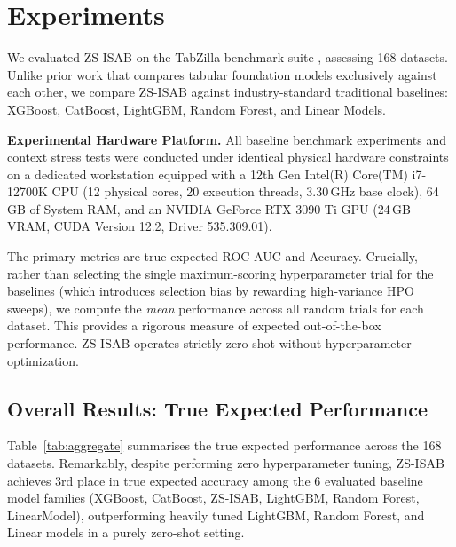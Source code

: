 \documentclass[10pt]{article}
\begin{document}
\section{Experiments}

We evaluated ZS-ISAB on the TabZilla benchmark suite \citep{mcelfresh2023when}, assessing 168 datasets. Unlike prior work that compares tabular foundation models exclusively against each other, we compare ZS-ISAB against industry-standard traditional baselines: XGBoost, CatBoost, LightGBM, Random Forest, and Linear Models.

\textbf{Experimental Hardware Platform.} All baseline benchmark experiments and context stress tests were conducted under identical physical hardware constraints on a dedicated workstation equipped with a 12th Gen Intel(R) Core(TM) i7-12700K CPU (12 physical cores, 20 execution threads, 3.30\,GHz base clock), 64\,GB of System RAM, and an NVIDIA GeForce RTX 3090 Ti GPU (24\,GB VRAM, CUDA Version 12.2, Driver 535.309.01).

The primary metrics are true expected ROC AUC and Accuracy. Crucially, rather than selecting the single maximum-scoring hyperparameter trial for the baselines (which introduces selection bias by rewarding high-variance HPO sweeps), we compute the \emph{mean} performance across all random trials for each dataset. This provides a rigorous measure of expected out-of-the-box performance. ZS-ISAB operates strictly zero-shot without hyperparameter optimization.

\subsection{Overall Results: True Expected Performance}

Table~\ref{tab:aggregate} summarises the true expected performance across the 168 datasets. Remarkably, despite performing zero hyperparameter tuning, ZS-ISAB achieves 3rd place in true expected accuracy among the 6 evaluated baseline model families (XGBoost, CatBoost, ZS-ISAB, LightGBM, Random Forest, LinearModel), outperforming heavily tuned LightGBM, Random Forest, and Linear models in a purely zero-shot setting.
\end{document}
